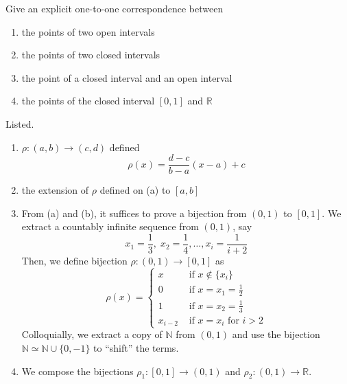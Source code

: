   \begin{exercise}[Zorich 2.4.2]
    Give an explicit one-to-one correspondence between 
    \begin{enumerate}
      \item the points of two open intervals 
      \item the points of two closed intervals 
      \item the point of a closed interval and an open interval 
      \item the points of the closed interval $[0, 1]$ and $\mathbb{R}$
    \end{enumerate}
  \end{exercise}
  \begin{solution}
    Listed. 
    \begin{enumerate}
      \item $\rho: (a, b) \to (c, d)$ defined 
      \begin{equation}
        \rho(x) = \frac{d - c}{b - a} (x - a) + c
      \end{equation}
      \item the extension of $\rho$ defined on (a) to $[a, b]$
      \item From (a) and (b), it suffices to prove a bijection from $(0, 1)$ to $[0, 1]$. We extract a countably infinite sequence from $(0, 1)$, say 
      \begin{equation}
        x_1 = \frac{1}{3}, \; x_2 = \frac{1}{4}, \ldots, x_i = \frac{1}{i+2}
      \end{equation}
      Then, we define bijection $\rho: (0, 1) \to [0, 1]$ as 
      \begin{equation}
        \rho (x) = \begin{cases}
              x & \text{ if } x \not\in \{x_i\} \\
              0 & \text{ if } x = x_1 = \frac{1}{2} \\
              1 & \text{ if } x = x_2 = \frac{1}{3} \\
              x_{i-2} & \text{ if } x = x_i \text{ for } i > 2
              \end{cases}
      \end{equation}
      Colloquially, we extract a copy of $\mathbb{N}$ from $(0, 1)$ and use the bijection $\mathbb{N} \simeq \mathbb{N} \cup \{0, -1\}$ to ``shift'' the terms. 
      \item We compose the bijections $\rho_1 : [0, 1] \to (0, 1)$ and $\rho_2: (0, 1) \to \mathbb{R}$. 
    \end{enumerate}
  \end{solution}

